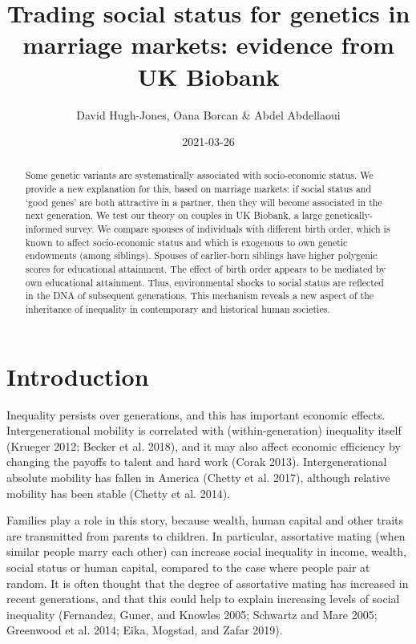 \documentclass[
]{article}
\title{Trading social status for genetics in marriage markets: evidence from UK Biobank}
\author{David Hugh-Jones, Oana Borcan \& Abdel Abdellaoui}
\date{2021-03-26}
\begin{document}
\maketitle
\begin{abstract}
Some genetic variants are systematically associated with
socio-economic status. We provide a new explanation for this, based on
marriage markets: if social status and `good genes' are both attractive in
a partner, then they will become associated in the next generation. We test
our theory on couples in UK Biobank, a large genetically-informed survey.
We compare spouses of individuals with different birth order, which is
known to affect socio-economic status and which is
exogenous to own genetic endowments (among siblings). Spouses of
earlier-born siblings have higher polygenic scores for educational
attainment. The effect of birth order appears to be mediated by own
educational attainment. Thus, environmental shocks to social status are
reflected in the DNA of subsequent generations. This mechanism reveals a
new aspect of the inheritance of inequality in contemporary and
historical human societies.
\end{abstract}

\normalem

\hypertarget{introduction}{%
\section{Introduction}\label{introduction}}

Inequality persists over generations, and this has important economic
effects. Intergenerational mobility is correlated with
(within-generation) inequality itself (Krueger 2012; Becker et al. 2018), and it may also affect economic efficiency by
changing the payoffs to talent and hard work (Corak 2013).
Intergenerational absolute mobility has fallen in America
(Chetty et al. 2017), although relative mobility has been stable
(Chetty et al. 2014).

Families play a role in this story, because wealth, human capital and
other traits are transmitted from parents to children. In particular,
assortative mating (when similar people marry each other) can increase
social inequality in income, wealth, social status or human capital,
compared to the case where people pair at random. It is often thought
that the degree of assortative mating has increased in recent
generations, and that this could help to explain increasing levels of
social inequality (Fernandez, Guner, and Knowles 2005; Schwartz and Mare 2005; Greenwood et al. 2014; Eika, Mogstad, and Zafar 2019).
\end{document}
